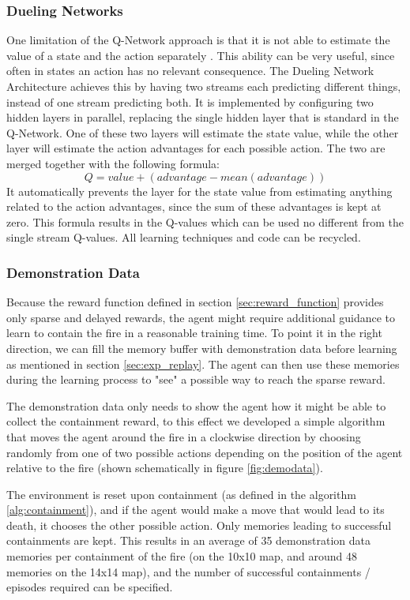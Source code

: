 \subsubsection{Dueling Networks}\label{sec:dueling}
One limitation of the Q-Network approach is that it is not able to estimate the value of a state and the action separately \citep{wang2015dueling}. This ability can be very useful, since often in states an action has no relevant consequence. The Dueling Network Architecture achieves this by having two streams each predicting different things, instead of one stream predicting both. It is implemented by configuring two hidden layers in parallel, replacing the single hidden layer that is standard in the Q-Network. One of these two layers will estimate the state value, while the other layer will estimate the action advantages for each possible action. The two are merged together with the following formula:
$$ Q = value + (advantage - mean(advantage))$$
It automatically prevents the layer for the state value from estimating anything related to the action advantages, since the sum of these advantages is kept at zero. This formula results in the Q-values which can be used no different from the single stream Q-values. All learning techniques and code can be recycled.



\subsubsection{Demonstration Data}\label{sec:demo_data}
Because the reward function defined in section \ref{sec:reward_function} provides only sparse and delayed rewards, the agent might require additional guidance to learn to contain the fire in a reasonable training time. To point it in the right direction, we can fill the memory buffer with demonstration data before learning as mentioned in section \ref{sec:exp_replay}. The agent can then use these memories during the learning process to "see" a possible way to reach the sparse reward.

The demonstration data only needs to show the agent how it might be able to collect the containment reward, to this effect we developed a simple algorithm that moves the agent around the fire in a clockwise direction by choosing randomly from one of two possible actions depending on the position of the agent relative to the fire (shown schematically in figure \ref{fig:demodata}). 

The environment is reset upon containment (as defined in the algorithm \ref{alg:containment}), and if the agent would make a move that would lead to its death, it chooses the other possible action. Only memories leading to successful containments are kept. This results in an average of 35 demonstration data memories per containment of the fire (on the 10x10 map, and around 48 memories on the 14x14 map), and the number of successful containments / episodes required can be specified.

